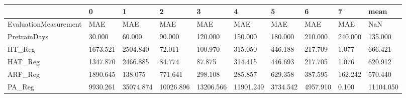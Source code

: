 \begin{tabular}{llllllllll}
\toprule
{} &        0 &         1 &         2 &         3 &         4 &        5 &        6 &       7 &      mean \\
\midrule
EvaluationMeasurement &      MAE &       MAE &       MAE &       MAE &       MAE &      MAE &      MAE &     MAE &       NaN \\
PretrainDays          &   30.000 &    60.000 &    90.000 &   120.000 &   150.000 &  180.000 &  210.000 & 240.000 &   135.000 \\
HT\_Reg                & 1673.521 &  2504.840 &    72.011 &   100.970 &   315.050 &  446.188 &  217.709 &   1.077 &   666.421 \\
HAT\_Reg               & 1347.870 &  2466.885 &    84.774 &    87.875 &   314.415 &  446.693 &  217.705 &   1.076 &   620.912 \\
ARF\_Reg               & 1890.645 &   138.075 &   771.641 &   298.108 &   285.857 &  629.358 &  387.595 & 162.242 &   570.440 \\
PA\_Reg                & 9930.261 & 35074.874 & 10026.896 & 13206.566 & 11901.249 & 3734.542 & 4957.910 &   0.100 & 11104.050 \\
\bottomrule
\end{tabular}
